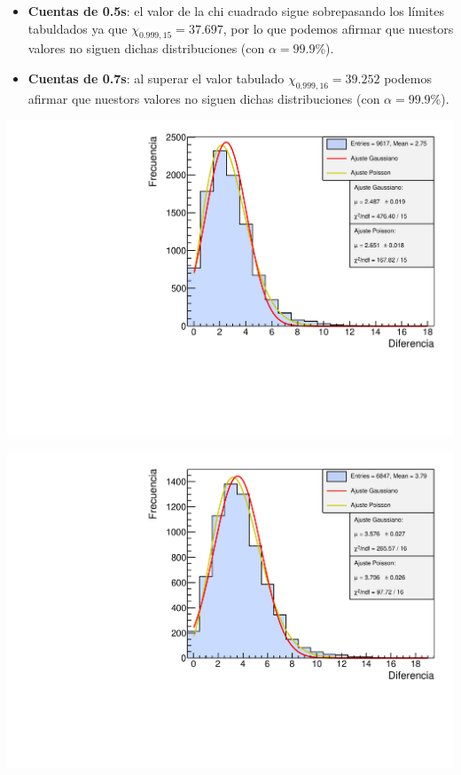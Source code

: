 \documentclass[11pt]{article}
\begin{document}
\begin{itemize}
	\item \textbf{Cuentas de 0.5s}: el valor de la chi cuadrado sigue sobrepasando los límites tabuldados ya que $\chi_{0.999,15}= 37.697$, por lo que podemos afirmar que nuestors valores no siguen dichas distribuciones (con $\alpha=99.9$\%).
	\item \textbf{Cuentas de 0.7s}: al superar el valor tabulado $\chi_{0.999,16}=39.252$ podemos afirmar que nuestors valores no siguen dichas distribuciones (con $\alpha=99.9$\%).
\end{itemize}


\begin{minipage}[t]{0.5\linewidth}
\begin{center}
	\label{Fig:5ms}
	\includegraphics[width=1\linewidth]{../Graficas/Histo_5ms.pdf}
\end{center}
\end{minipage}	
\hfill
\begin{minipage}[t]{0.5\linewidth}
\begin{center}
	\label{Fig:7ms}
	\includegraphics[width=1\linewidth]{../Graficas/Histo_7ms.pdf}
\end{center}
\end{minipage}	
\end{document}
